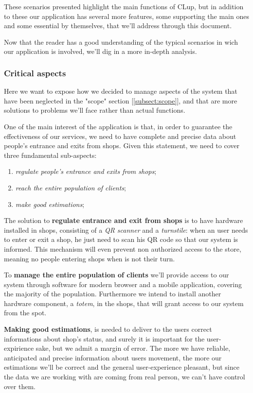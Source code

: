 These scenarios presented highlight the main functions of CLup, but in addition to these our application has several more features, some supporting the main ones and some essential by themselves, that we'll address through this document.

Now that the reader has a good understanding of the typical scenarios in wich our application is involved, we'll dig in a more in-depth analysis.

\subsubsection{Critical aspects}
\label{subsubsect:criticalaspects}

Here we want to expose how we decided to manage aspects of the system that have been neglected in the "scope" section [\ref{subsect:scope}], and that are more solutions to problems we'll face rather than actual functions.

One of the main interest of the application is that, in order to guarantee the effectiveness of our services, we need to have complete and precise data about people's entrance and exits from shops. Given this statement, we need to cover three fundamental sub-aspects:
\begin{enumerate}[topsep=0pt]
    \item \textit{regulate people's entrance and exits from shops};
    \item \textit{reach the entire population of clients};
    \item \textit{make good estimations};
\end{enumerate}

The solution to \textbf{regulate entrance and exit from shops} is to have hardware installed in shops, consisting of a \textit{QR scanner} and a \textit{turnstile}: when an user needs to enter or exit a shop, he just need to scan his QR code so that our system is informed. This mechanism will even prevent non authorized access to the store, meaning no people entering shops when is not their turn.

To \textbf{manage the entire population of clients} we'll provide access to our system through software for modern browser and a mobile application, covering the majority of the population. Furthermore we intend to install another hardware component, a \textit{totem}, in the shops, that will grant access to our system from the spot.

\textbf{Making good estimations}, is needed to deliver to the users correct informations about shop's status, and surely it is important for the user-expirience sake, but we admit a margin of error. The more we have reliable, anticipated and precise information about users movement, the more our estimations we'll be correct and the general user-experience pleasant, but since the data we are working with are coming from real person, we can't have control over them. 

